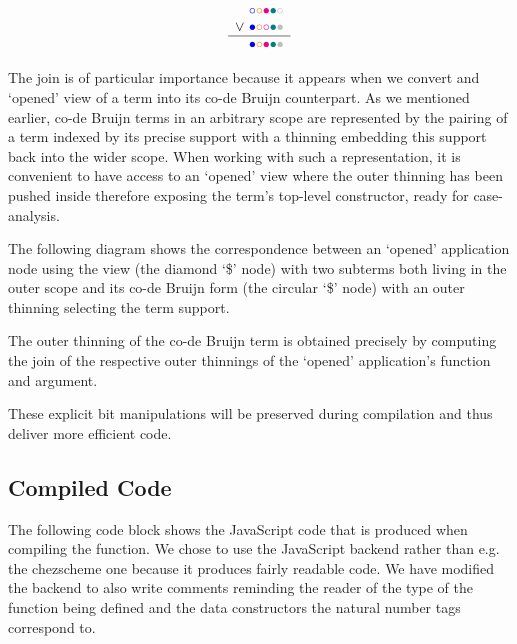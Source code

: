 \[
\begin{array}{c@{~}l}
& \color{blue}{\circ}\color{orange}{\circ}\color{magenta}{\bullet}\color{teal}{\bullet}\color{lightgray}{\circ} \\
  \vee & \color{blue}{\bullet}\color{orange}{\circ}\color{magenta}{\circ}\color{teal}{\bullet}\color{lightgray}{\bullet} \\
  \hline
  & \color{blue}{\bullet}\color{orange}{\circ}\color{magenta}{\bullet}\color{teal}{\bullet}\color{lightgray}{\bullet} \\
\end{array}
\]

The join is of particular importance because it appears when we convert and `opened'
view of a term into its co-de Bruijn counterpart.
%
As we mentioned earlier, co-de Bruijn terms in an arbitrary scope are represented by
the pairing of a term indexed by its precise support with a thinning embedding this
support back into the wider scope.
%
When working with such a representation, it is convenient to have access to an
`opened' view where the outer thinning has been pushed inside therefore exposing
the term's top-level constructor, ready for case-analysis.


The following diagram shows the correspondence between an `opened' application node
using the view (the diamond `\$' node) with two subterms both living in the outer scope
and its co-de Bruijn form (the circular `\$' node) with an outer thinning selecting the
term support.

\noindent
\begin{minipage}{.45\textwidth}\center
\end{minipage}\hfill
\begin{minipage}{.45\textwidth}\center
\end{minipage}

The outer thinning of the co-de Bruijn term is obtained precisely by
computing the join of the respective outer thinnings of the `opened'
application's function and argument.

These explicit bit manipulations will be preserved during compilation and
thus deliver more efficient code.


\subsection{Compiled Code}\label{sec:compiledview}

The following code block shows the JavaScript code that is produced when compiling the
 function. We chose to use the JavaScript backend rather than e.g.
the chezscheme one because it produces fairly readable code.
%
We have modified the backend to also write comments reminding the reader of the type
of the function being defined and the data constructors the natural number tags
correspond to.

